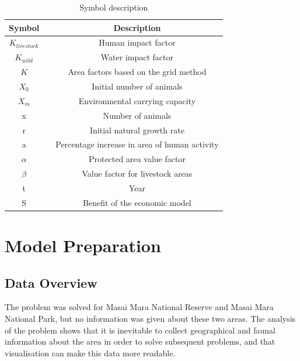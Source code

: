 \documentclass{mcmthesis}
\numberwithin{figure}{section}
\numberwithin{table}{section}
\numberwithin{equation}{section}
\begin{document}
\begin{table}[]
	\normalsize
	\renewcommand\arraystretch{1.25}
	\centering
	\caption{Symbol description}
	\setlength{\tabcolsep}{18mm}
    \large
	\begin{tabular}{@{}ccc@{}}
		\toprule
		Symbol &  & Description                                         \\ \midrule
		$K_{livestock}$   &  & Human impact factor \\  
        $K_{wild}$   &  & Water impact factor                                             \\
		$K$   &  &  Area factors based on the grid method                                     \\
		$X_0$      &  & Initial number of animals                                   \\
		$X_m$     &  & Environmental carrying capacity                                       \\
		x    &  & Number of animals\\
        r    &  & Initial natural growth rate                                        \\
		a     &  &   Percentage increase in area of human activity                \\
		$\alpha$    &  & Protected area value factor                             \\
		$\beta$      &  & Value factor for livestock areas                               \\
		t     &  & Year            \\
		S     &  & Benefit of the economic model           \\
 \bottomrule
	\end{tabular}
\end{table}




\section{Model Preparation}

\subsection{Data Overview}
The problem was solved for Masai Mara National Reserve and Masai Mara National Park, but no information was given about these two areas. The analysis of the problem shows that it is inevitable to collect geographical and faunal information about the area in order to solve subsequent problems, and that visualisation can make this data more readable.
\end{document}
